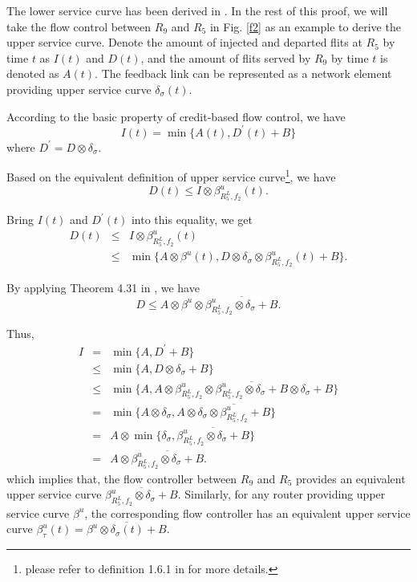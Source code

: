 \documentclass[10pt,journal]{IEEEtran}
\begin{document}
\begin{IEEEproof}
The lower service curve has been derived in \cite{qian2009analysis}. In the rest of this proof, we will take the flow control between $R_9$ and $R_5$ in Fig. \ref{f2} as an example to derive the upper service curve. Denote the amount of injected and departed flits at $R_5$ by time $t$ as $I(t)$ and $D(t)$, and the amount of flits served by $R_9$ by time $t$ is denoted as $A(t)$. The feedback link can be represented as a network element providing upper service curve $\delta_\sigma(t)$.

According to the basic property of credit-based flow control, we have $$I(t)=\min\{A(t),D^\prime(t)+B\}$$ where $D^\prime=D\otimes\delta_\sigma$.

Based on the equivalent definition of upper service curve\footnote{please refer to definition 1.6.1 in \cite{Boudec2001Network} for more details.}, we have
$$D(t)\leq I\otimes \beta_{R_5^L,f_2}^u(t).$$

Bring $I(t)$ and $D^\prime(t)$ into this equality, we get
\begin{eqnarray*}
D(t)&\leq& I\otimes \beta_{R_5^L,f_2}^u(t)\\
&\leq& \min\{A\otimes \beta^u(t),D\otimes\delta_\sigma\otimes \beta_{R_5^L,f_2}^u(t)+B\}.
\end{eqnarray*}

By applying Theorem 4.31 in \cite{Boudec2001Network}, we have
$$D\leq A\otimes \beta^u\otimes\overline{\beta_{R_5^L,f_2}^u\otimes\delta_\sigma+B}.$$

Thus,
\begin{eqnarray*}
  I&=& \min\{A,D^\prime+B\}\\
  &\leq& \min\{A,D\otimes\delta_\sigma+B\}\\
  &\leq& \min\{A,A\otimes \beta_{R_5^L,f_2}^u\otimes\overline{\beta_{R_5^L,f_2}^u\otimes\delta_\sigma+B}\otimes\delta_\sigma+B\}\\
  &=& \min\{A\otimes \delta_\sigma,A\otimes \overline{\delta_\sigma\otimes\beta_{R_5^L,f_2}^u+B}\}\\
  &=& A\otimes\min\{\delta_\sigma,\overline{\beta_{R_5^L,f_2}^u\otimes\delta_\sigma+B}\}\\
  &=& A\otimes\overline{\beta_{R_5^L,f_2}^u\otimes\delta_\sigma+B}.
\end{eqnarray*}
which implies that, the flow controller between $R_9$ and $R_5$ provides an equivalent upper service curve $\overline{\beta_{R_5^L,f_2}^u\otimes\delta_\sigma+B}$. Similarly, for any router providing upper service curve $\beta^u$, the corresponding flow controller has an equivalent upper service curve $\beta^{u}_\tau(t)=\overline{\beta^u\otimes\delta_\sigma(t)+B}$.
\end{IEEEproof}
\end{document}
